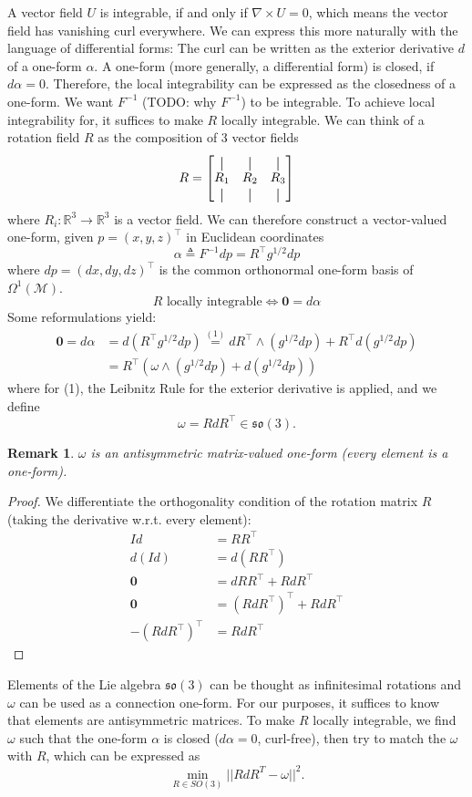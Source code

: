 \documentclass[a4paper,twoside,openright,11pt]{report}
\newcommand*{\vertbar}{\rule[-1ex]{0.5pt}{2.5ex}}
\newtheorem*{remark}{Remark}
\begin{document}
A vector field $U$ is integrable, if and only if $\nabla \times U = 0$,
which means the vector field has vanishing curl everywhere.
We can express this more naturally with the language of differential forms:
The curl can be written as the exterior derivative $d$ of a one-form $\alpha$.
A one-form (more generally, a differential form) is closed, if $d\alpha = 0$.
Therefore, the local integrability can be expressed as the closedness of a one-form.
We want $F^{-1}$ (TODO: why $F^{-1}$) to be integrable.
To achieve local integrability for, it suffices to make $R$ locally integrable.
We can think of a rotation field $R$ as the composition of 3 vector fields
$$R = \begin{bmatrix}
  \vertbar & \vertbar & \vertbar \\
  R_1 & R_2 & R_3 \\
  \vertbar & \vertbar & \vertbar
\end{bmatrix}$$
where $R_i : \mathbb{R}^3 \to \mathbb{R}^3$ is a vector field.
We can therefore construct a vector-valued one-form, given $p=(x,y,z)^{\top}$ in Euclidean coordinates
$$\alpha \triangleq F^{-1}dp = R^{\top}g^{1/2}dp$$
where $dp = (dx,dy,dz)^{\top}$ is the common orthonormal one-form basis of $\Omega^1(\mathcal{M})$.
$$R \text{ locally integrable} \iff \bm{0} = d\alpha$$
Some reformulations yield:
\begin{align*}
  \bm{0} = d\alpha &= d(R^{\top}g^{1/2}dp)\overset{(1)}{=} dR^{\top} \wedge  (g^{1/2}dp) + R^{\top}d(g^{1/2}dp) \\
  &= R^{\top}(\omega \wedge (g^{1/2}dp)+ d(g^{1/2}dp))
\end{align*} where for (1), the Leibnitz Rule for the exterior derivative is applied,
and we define
$$\omega = RdR^{\top} \in \mathfrak{so}(3).$$
\begin{remark}
  $\omega$ is an antisymmetric matrix-valued one-form (every element is a one-form).
\end{remark}
\begin{proof}
  We differentiate the orthogonality condition of the rotation matrix $R$ (taking the derivative w.r.t. every element):
  \begin{align*}
    Id &= RR^{\top} \\
    d(Id) &= d(RR^{\top}) \\
    \bm{0} &= dRR^{\top} + RdR^{\top} \\
    \bm{0} &= (RdR^{\top})^{\top} + RdR^{\top} \\
    -(RdR^{\top})^{\top} &= RdR^{\top}
  \end{align*}
\end{proof}
Elements of the Lie algebra $\mathfrak{so}(3)$ can be thought as infinitesimal rotations and $\omega$ can be used
as a connection one-form. For our purposes, it suffices to know that elements are antisymmetric matrices.
To make $R$ locally integrable, we find $\omega$ such that the one-form $\alpha$ is closed ($d\alpha = 0$, curl-free),
then try to match the $\omega$ with $R$, which can be expressed as
$$\min_{R\in SO(3)} ||RdR^T - \omega ||^2.$$
\end{document}
